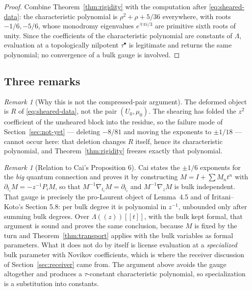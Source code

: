\documentclass[11pt]{article}
\theoremstyle{definition}
\theoremstyle{remark}
\newtheorem{remark}[theorem]{Remark}
\begin{document}
\begin{proof}
Combine Theorem~\ref{thm:rigidity} with the computation after
\eqref{eq:sheared-data}: the characteristic polynomial is $\rho^2+\rho+5/36$
everywhere, with roots $-1/6,-5/6$, whose monodromy eigenvalues
$e^{\mp\pi i/3}$ are primitive sixth roots of unity. Since the coefficients of
the characteristic polynomial are constants of $\Lambda$, evaluation at a
topologically nilpotent $\tau^\bullet$ is legitimate and returns the same
polynomial; no convergence of a bulk gauge is involved.
\end{proof}

\subsection*{Three remarks}

\begin{remark}[Why this is not the compressed-pair argument]
The deformed object is $R$ of \eqref{eq:sheared-data}, not the pair
$(U_0,\mu_0)$. The shearing has folded the $z^2$ coefficient of the unsheared
block into the residue, so the failure mode of Section~\ref{sec:not-yet} ---
deleting $-8/81$ and moving the exponents to $\pm1/18$ --- cannot occur here:
that deletion changes $R$ itself, hence its characteristic polynomial, and
Theorem~\ref{thm:rigidity} freezes exactly that polynomial.
\end{remark}

\begin{remark}[Relation to Cai's Proposition 6]
Cai states the $\pm1/6$ exponents for the \emph{big} quantum connection and
proves it by constructing $M=I+\sum M_n t^n$ with $\partial_{t_i}M=-z^{-1}P_iM$,
so that $M^{-1}\nabla_{t_i}M=\partial_{t_i}$ and $M^{-1}\nabla_zM$ is bulk
independent. That gauge is precisely the pro-Laurent object of
Lemma~4.5 and of Iritani--Koto's Section 5.8: per bulk degree it is polynomial
in $z^{-1}$, unbounded only after summing bulk degrees. Over
$\Lambda((z))[[t]]$, with the bulk kept formal, that argument is sound and
proves the same conclusion, because $M$ is fixed by the turn and
Theorem~\ref{thm:transport} applies with the bulk variables as formal
parameters. What it does not do by itself is license evaluation at a
\emph{specialized} bulk parameter with Novikov coefficients, which is where the
receiver discussion of Section~\ref{sec:receiver} came from. The argument above
avoids the gauge altogether and produces a $\tau$-constant characteristic
polynomial, so specialization is a substitution into constants.
\end{remark}
\end{document}
